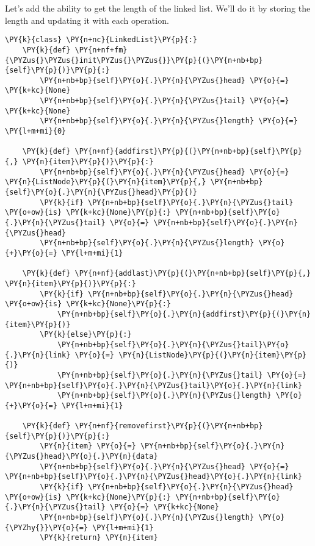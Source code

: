 Let's add the ability to get the length of the linked list.
We'll do it by storing the length and updating it with each operation.

\begin{Verbatim}[commandchars=\\\{\}]
\PY{k}{class} \PY{n+nc}{LinkedList}\PY{p}{:}
    \PY{k}{def} \PY{n+nf+fm}{\PYZus{}\PYZus{}init\PYZus{}\PYZus{}}\PY{p}{(}\PY{n+nb+bp}{self}\PY{p}{)}\PY{p}{:}
        \PY{n+nb+bp}{self}\PY{o}{.}\PY{n}{\PYZus{}head} \PY{o}{=} \PY{k+kc}{None}
        \PY{n+nb+bp}{self}\PY{o}{.}\PY{n}{\PYZus{}tail} \PY{o}{=} \PY{k+kc}{None}
        \PY{n+nb+bp}{self}\PY{o}{.}\PY{n}{\PYZus{}length} \PY{o}{=} \PY{l+m+mi}{0}

    \PY{k}{def} \PY{n+nf}{addfirst}\PY{p}{(}\PY{n+nb+bp}{self}\PY{p}{,} \PY{n}{item}\PY{p}{)}\PY{p}{:}
        \PY{n+nb+bp}{self}\PY{o}{.}\PY{n}{\PYZus{}head} \PY{o}{=} \PY{n}{ListNode}\PY{p}{(}\PY{n}{item}\PY{p}{,} \PY{n+nb+bp}{self}\PY{o}{.}\PY{n}{\PYZus{}head}\PY{p}{)}
        \PY{k}{if} \PY{n+nb+bp}{self}\PY{o}{.}\PY{n}{\PYZus{}tail} \PY{o+ow}{is} \PY{k+kc}{None}\PY{p}{:} \PY{n+nb+bp}{self}\PY{o}{.}\PY{n}{\PYZus{}tail} \PY{o}{=} \PY{n+nb+bp}{self}\PY{o}{.}\PY{n}{\PYZus{}head}
        \PY{n+nb+bp}{self}\PY{o}{.}\PY{n}{\PYZus{}length} \PY{o}{+}\PY{o}{=} \PY{l+m+mi}{1}

    \PY{k}{def} \PY{n+nf}{addlast}\PY{p}{(}\PY{n+nb+bp}{self}\PY{p}{,} \PY{n}{item}\PY{p}{)}\PY{p}{:}
        \PY{k}{if} \PY{n+nb+bp}{self}\PY{o}{.}\PY{n}{\PYZus{}head} \PY{o+ow}{is} \PY{k+kc}{None}\PY{p}{:}
            \PY{n+nb+bp}{self}\PY{o}{.}\PY{n}{addfirst}\PY{p}{(}\PY{n}{item}\PY{p}{)}
        \PY{k}{else}\PY{p}{:}
            \PY{n+nb+bp}{self}\PY{o}{.}\PY{n}{\PYZus{}tail}\PY{o}{.}\PY{n}{link} \PY{o}{=} \PY{n}{ListNode}\PY{p}{(}\PY{n}{item}\PY{p}{)}
            \PY{n+nb+bp}{self}\PY{o}{.}\PY{n}{\PYZus{}tail} \PY{o}{=} \PY{n+nb+bp}{self}\PY{o}{.}\PY{n}{\PYZus{}tail}\PY{o}{.}\PY{n}{link}
            \PY{n+nb+bp}{self}\PY{o}{.}\PY{n}{\PYZus{}length} \PY{o}{+}\PY{o}{=} \PY{l+m+mi}{1}

    \PY{k}{def} \PY{n+nf}{removefirst}\PY{p}{(}\PY{n+nb+bp}{self}\PY{p}{)}\PY{p}{:}
        \PY{n}{item} \PY{o}{=} \PY{n+nb+bp}{self}\PY{o}{.}\PY{n}{\PYZus{}head}\PY{o}{.}\PY{n}{data}
        \PY{n+nb+bp}{self}\PY{o}{.}\PY{n}{\PYZus{}head} \PY{o}{=} \PY{n+nb+bp}{self}\PY{o}{.}\PY{n}{\PYZus{}head}\PY{o}{.}\PY{n}{link}
        \PY{k}{if} \PY{n+nb+bp}{self}\PY{o}{.}\PY{n}{\PYZus{}head} \PY{o+ow}{is} \PY{k+kc}{None}\PY{p}{:} \PY{n+nb+bp}{self}\PY{o}{.}\PY{n}{\PYZus{}tail} \PY{o}{=} \PY{k+kc}{None}
        \PY{n+nb+bp}{self}\PY{o}{.}\PY{n}{\PYZus{}length} \PY{o}{\PYZhy{}}\PY{o}{=} \PY{l+m+mi}{1}
        \PY{k}{return} \PY{n}{item}


\end{Verbatim}
